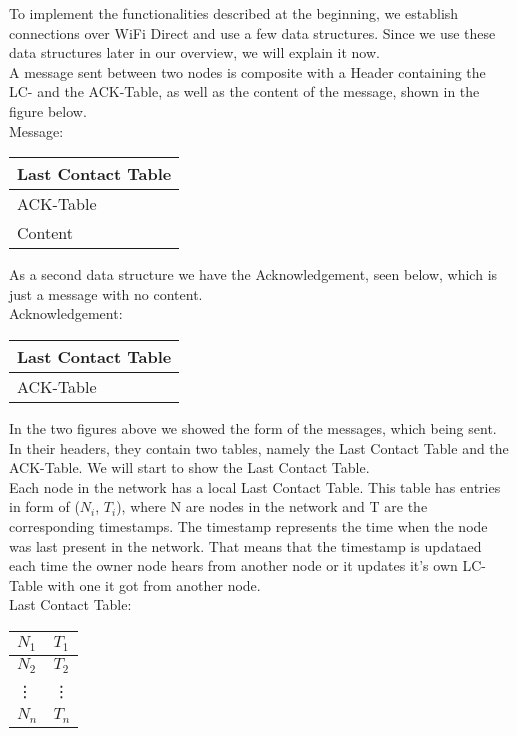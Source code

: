 			To implement the functionalities described at the beginning, we establish connections over WiFi Direct and use a few data structures. Since we use these data structures later in our overview, we will explain it now. \\

			A message sent between two nodes is composite with a Header containing the LC- and the ACK-Table, as well as the content of the message, shown in the figure below. \\

		Message:
			\begin{center}
				\begin{tabular}{ | l |}
					\hline
					Last Contact Table \\ \hline
					ACK-Table \\ \hline
					Content \\ \hline
				\end{tabular}
			\end{center}


As a second data structure we have the Acknowledgement, seen below, which is just a message with no content. \\


			Acknowledgement:
			\begin{center}
				\begin{tabular}{ | l |}
					\hline
					Last Contact Table \\ \hline
					ACK-Table \\ \hline
				\end{tabular}
			\end{center}
			
In the two figures above we showed the form of the messages, which being sent. In their headers, they contain two tables, namely the Last Contact Table and the ACK-Table. We will start to show the Last Contact Table. \\

Each node in the network has a local Last Contact Table. This table has entries in form of ($N_{i}$, $T_{i}$), where N are nodes in the network and T are the corresponding timestamps. The timestamp represents the time when the node was last present in the network. That means that the timestamp is updataed each time the owner node hears from another node or it updates it's own LC-Table with one it got from another node. \\

			Last Contact Table:
			\begin{center}
				\begin{tabular}{ | l | l |}
					\hline
					$N_{1}$ & $T_{1}$ \\ \hline
					$N_{2}$ & $T_{2}$ \\ \hline
					\vdots & \vdots \\ \hline
					$N_{n}$ & $T_{n}$ \\ 
					\hline
				\end{tabular}
			\end{center}
			

